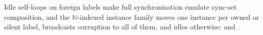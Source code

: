 \begin{definition}
  \label{def:idle-family}
  \leanok
  Idle self-loops on foreign labels make full synchronisation emulate sync-set composition, and the $\mathbb{N}$-indexed instance family moves one instance per owned or silent label, broadcasts corruption to all of them, and idles otherwise:  and .
\end{definition}
